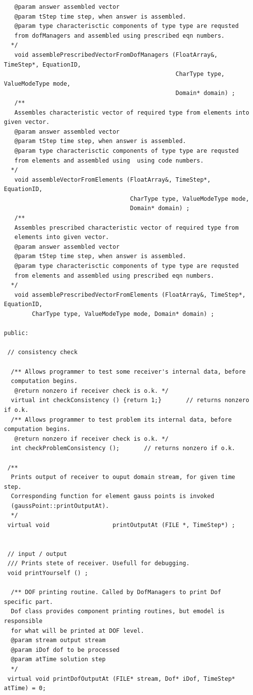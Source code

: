 \documentclass[a4paper]{article}
\begin{document}
{\begin{verbatim}
   @param answer assembled vector
   @param tStep time step, when answer is assembled.
   @param type characterisctic components of type type are requsted 
   from dofManagers and assembled using prescribed eqn numbers.
  */
   void assemblePrescribedVectorFromDofManagers (FloatArray&, TimeStep*, EquationID, 
                                                 CharType type, ValueModeType mode, 
                                                 Domain* domain) ;
   /**
   Assembles characteristic vector of required type from elements into given vector.
   @param answer assembled vector
   @param tStep time step, when answer is assembled.
   @param type characterisctic components of type type are requsted 
   from elements and assembled using  using code numbers.
  */
   void assembleVectorFromElements (FloatArray&, TimeStep*, EquationID, 
                                    CharType type, ValueModeType mode, 
                                    Domain* domain) ;
   /**
   Assembles prescribed characteristic vector of required type from 
   elements into given vector.
   @param answer assembled vector
   @param tStep time step, when answer is assembled.
   @param type characterisctic components of type type are requsted 
   from elements and assembled using prescribed eqn numbers.
  */
   void assemblePrescribedVectorFromElements (FloatArray&, TimeStep*, EquationID, 
        CharType type, ValueModeType mode, Domain* domain) ;

public:

 // consistency check

  /** Allows programmer to test some receiver's internal data, before
  computation begins.
   @return nonzero if receiver check is o.k. */
  virtual int checkConsistency () {return 1;}       // returns nonzero if o.k.
  /** Allows programmer to test problem its internal data, before computation begins.
   @return nonzero if receiver check is o.k. */
  int checkProblemConsistency ();       // returns nonzero if o.k.

 /** 
  Prints output of receiver to ouput domain stream, for given time step.
  Corresponding function for element gauss points is invoked
  (gaussPoint::printOutputAt).
  */
 virtual void                  printOutputAt (FILE *, TimeStep*) ;


 // input / output
 /// Prints stete of receiver. Usefull for debugging.
 void printYourself () ;

  /** DOF printing routine. Called by DofManagers to print Dof specific part.
  Dof class provides component printing routines, but emodel is responsible
  for what will be printed at DOF level.
  @param stream output stream
  @param iDof dof to be processed
  @param atTime solution step
  */
 virtual void printDofOutputAt (FILE* stream, Dof* iDof, TimeStep* atTime) = 0;



\end{verbatim}}
\end{document}
